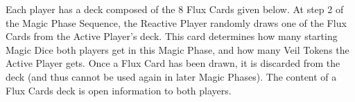 Each player has a deck composed of the 8 Flux Cards given below. At step 2 of the Magic Phase Sequence, the Reactive Player randomly draws one of the Flux Cards from the Active Player's deck. This card determines how many starting Magic Dice both players get in this Magic Phase, and how many Veil Tokens the Active Player gets. Once a Flux Card has been drawn, it is discarded from the deck (and thus cannot be used again in later Magic Phases). The content of a Flux Cards deck is open information to both players.

\begin{center}

\def\fluxcardwidth{0.23\textwidth}
\def\fluxcardgap{-0.01\textwidth}

\def\FluxCardTitle{\Largefontsize\textbf{Flux Card 1}}
\def\FluxCardDice{%
\textbf{4 Magic Dice}\par
(both players)}
\def\FluxCardVeil{\textbf{3 Veil Tokens}\par
(Active Player)}
\def\FluxCardMiscast{\normalfontsize All Miscasts this phase gain a \textbf{+1} Miscast Modifier}
\def\svgwidth{\fluxcardwidth}

\hspace{\fluxcardgap}
\def\FluxCardTitle{\Largefontsize\textbf{Flux Card 2}}
\def\FluxCardDice{%
\textbf{5 Magic Dice}\par
(both players)}
\def\FluxCardVeil{\textbf{2 Veil Tokens}\par
(Active Player)}
\def\FluxCardMiscast{}
\def\svgwidth{\fluxcardwidth}

\hspace{\fluxcardgap}
\def\FluxCardTitle{\Largefontsize\textbf{Flux Card 3}}
\def\FluxCardDice{%
\textbf{5 Magic Dice}\par
(both players)}
\def\FluxCardVeil{\textbf{5 Veil Tokens}\par
(Active Player)}
\def\FluxCardMiscast{}
\def\svgwidth{\fluxcardwidth}

\hspace{\fluxcardgap}
\def\FluxCardTitle{\Largefontsize\textbf{Flux Card 4}}
\def\FluxCardDice{%
\textbf{5 Magic Dice}\par
(both players)}
\def\FluxCardVeil{\textbf{7 Veil Tokens}\par
(Active Player)}
\def\FluxCardMiscast{}
\def\svgwidth{\fluxcardwidth}



\end{center}
